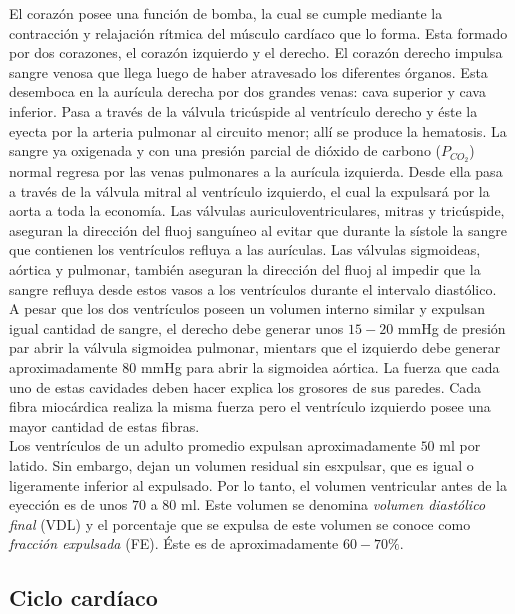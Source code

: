 El corazón posee una función de bomba, la cual se cumple mediante la contracción y relajación rítmica del músculo
cardíaco que lo forma. Esta formado por dos corazones, el corazón izquierdo y el derecho. El corazón derecho impulsa
sangre venosa que llega luego de haber atravesado los diferentes órganos. Esta desemboca en la aurícula derecha por
dos grandes venas: cava superior y cava inferior. Pasa a través de la válvula tricúspide al ventrículo derecho y
éste la eyecta por la arteria pulmonar al circuito menor; allí se produce la hematosis. La sangre ya oxigenada y con
una presión parcial de dióxido de carbono ($P_{CO_2}$) normal regresa por las venas pulmonares a la aurícula
izquierda. Desde ella pasa a través de la válvula mitral al ventrículo izquierdo, el cual la expulsará por la aorta
a toda la economía. Las válvulas auriculoventriculares, mitras y tricúspide, aseguran la dirección del fluoj
sanguíneo al evitar que durante la sístole la sangre que contienen los ventrículos refluya a las aurículas. Las
válvulas sigmoideas, aórtica y pulmonar, también aseguran la dirección del fluoj al impedir que la sangre refluya
desde estos vasos a los ventrículos durante el intervalo diastólico. \\
\indent A pesar que los dos ventrículos poseen un volumen interno similar y expulsan igual cantidad de sangre, el
derecho debe generar unos $15-20$ mmHg de presión par abrir la válvula sigmoidea pulmonar, mientars que el izquierdo
debe generar aproximadamente $80$ mmHg para abrir la sigmoidea aórtica. La fuerza que cada uno de estas cavidades
deben hacer explica los grosores de sus paredes. Cada fibra miocárdica realiza la misma fuerza pero el ventrículo
izquierdo posee una mayor cantidad de estas fibras. \\
\indent Los ventrículos de un adulto promedio expulsan aproximadamente $50$ ml por latido. Sin embargo, dejan un
volumen residual sin esxpulsar, que es igual o ligeramente inferior al expulsado. Por lo tanto, el volumen
ventricular antes de la eyección es de unos $70$ a $80$ ml. Este volumen se denomina \textit{volumen diastólico
final} (VDL) y el porcentaje que se expulsa de este volumen se conoce como \textit{fracción expulsada} (FE). Éste es
de aproximadamente $60-70\%$.

\subsection*{Ciclo cardíaco}

